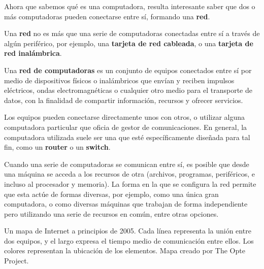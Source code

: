 Ahora que sabemos qué es una computadora, resulta interesante saber que dos o
más computadoras pueden conectarse entre sí, formando una \textbf{red}.

Una \textbf{red} no es más que una serie de computadoras conectadas entre sí a
través de algún periférico, por ejemplo, una \textbf{tarjeta de red cableada}, o
una \textbf{tarjeta de red inalámbrica}.

\begin{definition} Una \textbf{red de computadoras}
    es un conjunto de equipos conectados entre sí por medio de dispositivos
    físicos o inalámbricos que envían y reciben impulsos eléctricos, ondas
    electromagnéticas o cualquier otro medio para el transporte de datos, con la
    finalidad de compartir información, recursos y ofrecer
    servicios.\autocite[vid. cap. I]{lowe_2004}
\end{definition}

 Los equipos pueden conectarse directamente unos con
otros, o utilizar alguna computadora particular que oficia de gestor de
comunicaciones. En general, la computadora utilizada suele ser una que esté
específicamente diseñada para tal fin, como un \textbf{router} o un
\textbf{switch}.

Cuando una serie de computadoras se comunican entre sí, es posible que desde una
máquina se acceda a los recursos de otra (archivos, programas, periféricos, e
incluso al procesador y memoria). La forma en la que se configura la red permite
que esta actúe de formas diversas, por ejemplo, como una única gran computadora,
o como diversas máquinas que trabajan de forma independiente pero utilizando una
serie de recursos en común, entre otras opciones.

{Un mapa de Internet a principios de 2005. Cada línea representa la unión entre
dos equipos, y el largo expresa el tiempo medio de comunicación entre ellos. Los
colores representan la ubicación de los elementos.} {Mapa creado por The Opte
Project.}

